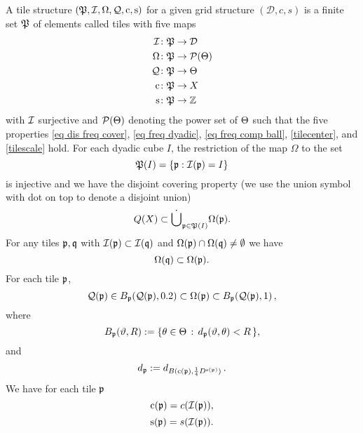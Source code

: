 A tile structure  $(\fP,\sc,\fc,\fcc,\pc,\ps)$
for a given grid structure $(\mathcal{D}, c, s)$
is a finite set $\fP$  of elements called tiles with five maps
\begin{align*}
\sc&\colon \fP\to {\mathcal{D}}\\
\fc&\colon \fP\to \mathcal{P}(\Mf) \\
\fcc &\colon \fP\to \Mf\\
\pc &\colon \fP\to X\\
\ps &\colon \fP\to \mathbb{Z}
\end{align*}
with $\sc$ surjective and $\mathcal{P}(\Mf)$ denoting the power set of $\Mf$ such that the five properties \eqref{eq dis freq cover}, \eqref{eq freq dyadic},
\eqref{eq freq comp ball}, \eqref{tilecenter}, and
\eqref{tilescale} hold.
For each dyadic cube $I$, the restriction of the  map $\Omega$ to the set
\begin{equation}\label{injective}
    \fP(I)=\{\fp: \sc(\fp) =I\}
\end{equation}
is injective
and we have the disjoint covering property (we use the union symbol with dot on top to denote a disjoint union)
\begin{equation}\label{eq dis freq cover}
\tQ(X)\subset \dot{\bigcup}_{\fp\in \fP(I)}\fc(\fp).
\end{equation}
For any tiles $\fp,\fq$ with $\sc(\fp)\subset \sc(\fq)$ and $\fc(\fp) \cap \fc(\fq) \neq  \emptyset$ we have
\begin{equation} \label{eq freq dyadic}
\fc(\fq)\subset \fc(\fp) .
\end{equation}
For each tile $\fp$,
        \begin{equation}\label{eq freq comp ball}
        \fcc(\fp)\in B_{\fp}(\fcc(\fp), 0.2) \subset \fc(\fp) \subset B_{\fp}(\fcc(\fp),1)\,,
        \end{equation}
        where
\begin{equation}
    B_{\fp} (\mfa, R) := \{\mfb \in \Mf \, : \, d_{\fp}(\mfa, \mfb) < R\,\} ,
\end{equation}
 and
\begin{equation}\label{defdp}
d_{\fp} := d_{B(\pc(\fp),\frac 14 D^{\ps(\fp)})}\, .
\end{equation}
We have for each tile $\fp$
\begin{equation}\label{tilecenter}
    \pc(\fp)=c(\sc(\fp)),
\end{equation}
\begin{equation}\label{tilescale}
    \ps(\fp)=s(\sc(\fp)).
\end{equation}


